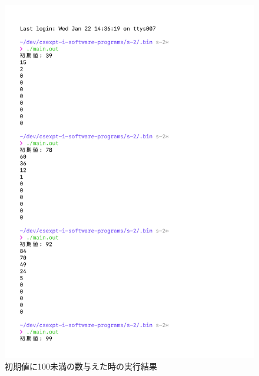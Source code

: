 % 
\begin{figure}[H]
    \centering
    \includegraphics[width=0.8\hsize, pagebox=mediabox, page=1]{main_result3_img.pdf}
    \caption{初期値に100未満の数与えた時の実行結果}
    \label{初期値に100未満の数与えた時の実行結果}
\end{figure}
